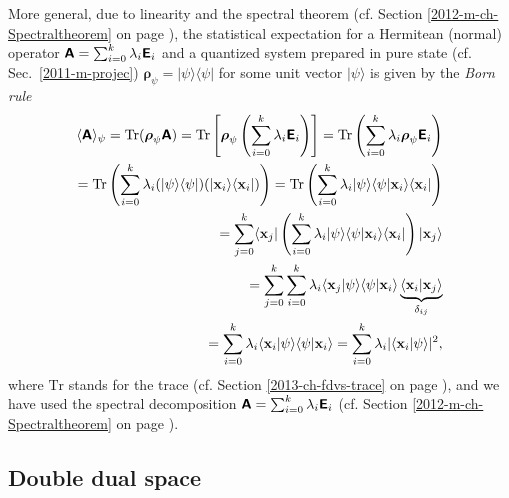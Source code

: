 {More general,  due to linearity and the spectral theorem
(cf. Section \ref{2012-m-ch-Spectraltheorem} on page \pageref{2012-m-ch-Spectraltheorem}),
the statistical expectation for a Hermitean (normal) operator $\textsf{\textbf{A}}=
\sum_{i=0}^k   \lambda_i \textsf{\textbf{E}}_i$
and a quantized system prepared in pure state
(cf. Sec.~\ref{2011-m-projec})
$\boldsymbol{\rho}_\psi = \vert {\psi}\rangle \langle \psi \vert$ for some unit vector $\vert {\psi}\rangle$
is given by the {\em Born rule}
\begin{equation}
\begin{split}
\langle \textsf{\textbf{A}}\rangle_{\psi} = \text{Tr} (\boldsymbol{\rho}_\psi \textsf{\textbf{A}})
=
\text{Tr}  \left[\boldsymbol{\rho}_\psi  \left(\sum_{i=0}^k   \lambda_i  \textsf{\textbf{E}}_i  \right)\right] =
\text{Tr}  \left(\sum_{i=0}^k   \lambda_i \boldsymbol{\rho}_\psi  \textsf{\textbf{E}}_i  \right)\\
=
 \text{Tr} \left(\sum_{i=0}^k   \lambda_i (\vert \psi \rangle \langle \psi \vert )( \vert {\bf x}_i \rangle \langle {\bf x}_i \vert )\right)
=
 \text{Tr} \left(\sum_{i=0}^k   \lambda_i  \vert \psi \rangle \langle \psi \vert   {\bf x}_i \rangle \langle {\bf x}_i \vert  \right)\\
=
\sum_{j=0}^k \langle {\bf x}_j \vert
\left(  \sum_{i=0}^k   \lambda_i  \vert \psi \rangle  \langle \psi   \vert {\bf x}_i \rangle   \langle {\bf x}_i \vert \right)   \vert{\bf x}_j \rangle    \\
=
\sum_{j=0}^k
   \sum_{i=0}^k   \lambda_i  \langle {\bf x}_j \vert \psi \rangle   \langle \psi   \vert {\bf x}_i \rangle
\underbrace{ \langle {\bf x}_i \vert    {\bf x}_j \rangle }_{\delta_{ij}}  \\
=
\sum_{i=0}^k   \lambda_i  \langle {\bf x}_i \vert \psi \rangle \langle \psi   \vert {\bf x}_i \rangle
=
\sum_{i=0}^k   \lambda_i \vert \langle {\bf x}_i \vert \psi \rangle \vert^2,
\end{split}
\label{2015-m-ch-fdlvs-bornr}
\end{equation}
where $\text{Tr}$ stands for the trace (cf. Section \ref{2013-ch-fdvs-trace} on page \pageref{2013-ch-fdvs-trace}),
and we have used the spectral decomposition $\textsf{\textbf{A}}= \sum_{i=0}^k   \lambda_i \textsf{\textbf{E}}_i$
(cf. Section \ref{2012-m-ch-Spectraltheorem} on page \pageref{2012-m-ch-Spectraltheorem}).
}


\subsection{Double dual space}
\label{2012-m-dds}

